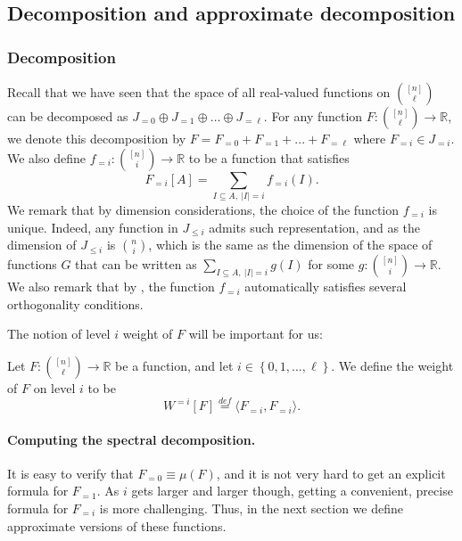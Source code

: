 \documentclass{toc}
\newcommand\card[1]{\left| {#1} \right|}
\newcommand\set[1]{{\left\{ #1 \right\}}}
\newcommand\defeq{\stackrel{def}{=}}
\newcommand\inner[2]{\langle{#1},{#2}\rangle}
\newcommand\xor{\oplus}
\renewcommand\leq{\leqslant}
\newcommand\lvlfn[2]{{#1}_{={#2}}}
\begin{document}
\subsection{Decomposition and approximate decomposition}
\subsubsection{Decomposition}
Recall that we have seen that the space of all real-valued functions on ${[n]\choose \ell}$
can be decomposed as $J_{=0}\xor J_{=1}\xor\ldots\xor J_{=\ell}$. For any function $F\colon {[n] \choose \ell}\to\mathbb{R}$, we denote this decomposition by $F=\lvlfn{F}{0}+\lvlfn{F}{1}+...+\lvlfn{F}{\ell}$ where $\lvlfn{F}{i}\in J_{=i}$.
We also define $\lvlfn{f}{i}\colon {[n] \choose i}\to\mathbb{R}$ to be a function that satisfies
\[
\lvlfn{F}{i}[A] = \sum\limits_{I\subseteq A,~\card{I} = i}{\lvlfn{f}{i}(I)}.
\]
We remark that by dimension considerations, the choice of the function $\lvlfn{f}{i}$ is unique. Indeed,
any function in $J_{\leq i}$ admits such representation, and as the dimension of $J_{\leq i}$ is $\binom{n}{i}$,
which is the same as the dimension of the space of functions $G$ that can be written as
$\sum\limits_{I\subseteq A,~\card{I} = i}{g(I)}$ for some $g\colon \binom{[n]}{i}\to\mathbb{R}$.
We also remark that by , the function $\lvlfn{f}{i}$ automatically satisfies several orthogonality
conditions.

The notion of level $i$ weight of $F$ will be important for us:
\begin{definition}
Let $F\colon {[n]\choose \ell}\to\mathbb{R}$ be a function, and let $i\in\set{0,1,...,\ell}$. We define the weight
of $F$ on level $i$ to be
\[
W^{=i}[F] \defeq \inner{\lvlfn{F}{i}}{\lvlfn{F}{i}}.
\]
%
\end{definition}


\paragraph{Computing the spectral decomposition.}
It is easy to verify that $\lvlfn{F}{0}\equiv \mu(F)$, and it is not very hard to get an explicit formula for $\lvlfn{F}{1}$.
As $i$ gets larger and larger though, getting a convenient, precise formula for $\lvlfn{F}{i}$ is more challenging. Thus,
in the next section we define approximate versions of these functions.
\end{document}
